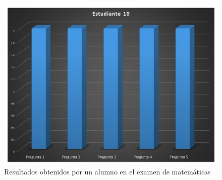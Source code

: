 \documentclass[12pt] {report}
\begin{document}
\begin{figure}[H]
\centering 
\includegraphics[scale=.4]{MEstudiante10.JPG}
\caption{Resultados obtenidos por un alumno en el examen de matemáticas}
\end{figure}
\end{document}
